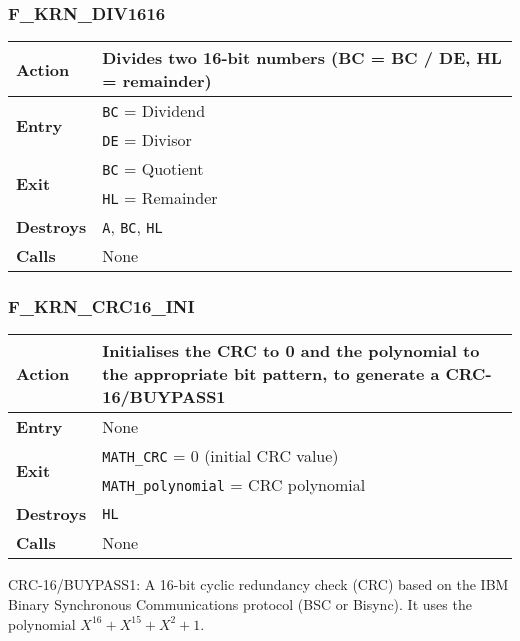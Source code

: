     \subsubsection{F\_KRN\_DIV1616}
    \label{func:fkrndiv1616}
    \begin{tabular}{l p{15cm}}
        \hline\textbf{Action}
        & Divides two 16-bit numbers (BC = BC / DE, HL = remainder)\\
        \hline\multirow[t]{2}{4em}{\textbf{Entry}}
        & \texttt{BC} = Dividend\\
        & \texttt{DE} = Divisor\\
        \hline\multirow[t]{2}{4em}{\textbf{Exit}}
        & \texttt{BC} = Quotient\\
        & \texttt{HL} = Remainder\\
        \hline\textbf{Destroys} & \texttt{A}, \texttt{BC}, \texttt{HL} \\
        \hline\textbf{Calls} & None\\
        \hline
    \end{tabular}

    \subsubsection{F\_KRN\_CRC16\_INI}
    \label{func:fkrncrc16ini}
    \begin{tabular}{l p{15cm}}
        \hline\textbf{Action}
        & Initialises the CRC to 0 and the polynomial to the appropriate bit
        pattern, to generate a CRC-16/BUYPASS1\\
        \hline\textbf{Entry} & None \\
        \hline\multirow[t]{2}{4em}{\textbf{Exit}}
        & \texttt{MATH\_CRC} = 0 (initial CRC value)\\
        & \texttt{MATH\_polynomial} = CRC polynomial\\
        \hline\textbf{Destroys} & \texttt{HL} \\
        \hline\textbf{Calls} & None\\
        \hline
    \end{tabular}

    CRC-16/BUYPASS1: A 16-bit cyclic redundancy check (CRC) based on the IBM
    Binary Synchronous Communications protocol (BSC or Bisync). It uses the
    polynomial $X^{16} + X^{15} +X^2 + 1$.

